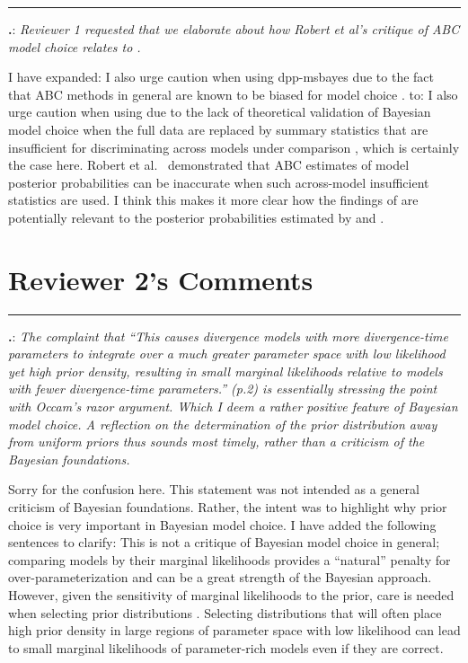 \documentclass[12pt]{article}
\newcounter{commentCounter}
\newcommand{\revcomment}[1]{{\addtocounter{commentCounter}{1}}
    \medskip \hrule \noindent
\textbf{\arabic{section}.\arabic{commentCounter}}: {\sl #1}\par\xspace}
\newcommand{\response}[1]{{\addtolength{\leftskip}{0.25in} #1\par}\xspace}
\let\quoteOld\quote
\let\endquoteOld\endquote
\renewenvironment{quote}{\sffamily\small\quoteOld}{\endquoteOld}
\begin{document}
\revcomment{
    Reviewer 1 requested that we elaborate about how Robert et al's
    \cite{Robert2011} critique of ABC model choice relates to \dppmsbayes.
}
\response{
    I have expanded:
    \begin{quote}
        I also urge caution when using dpp-msbayes due to the fact that ABC
        methods in general are known to be biased for model choice
        \cite{Robert2011}.
    \end{quote}
    to:
    \begin{quote}
        I also urge caution when using \dppmsbayes due to the lack of
        theoretical validation of Bayesian model choice when the full data are
        replaced by summary statistics that are insufficient for discriminating
        across models under comparison \cite{Robert2011}, which is certainly
        the case here.  Robert et al.\ \cite{Robert2011} demonstrated that ABC
        estimates of model posterior probabilities can be inaccurate when such
        across-model insufficient statistics are used.
    \end{quote}
    I think this makes it more clear how the findings of \cite{Robert2011} are
    potentially relevant to the posterior probabilities estimated by
    \dppmsbayes and \msb.
}

\section{Reviewer 2's Comments}
\setcounter{commentCounter}{0}

\revcomment{
    The complaint that ``This causes divergence models with more divergence-time
    parameters to integrate over a much greater parameter space with low
    likelihood yet high prior density, resulting in small marginal likelihoods
    relative to models with fewer divergence-time parameters.'' (p.2) is
    essentially stressing the point with Occam's razor argument. Which I deem a
    rather positive feature of Bayesian model choice. A reflection on the
    determination of the prior distribution away from uniform priors thus
    sounds most timely, rather than a criticism of the Bayesian foundations.
}
\response{
    Sorry for the confusion here. This statement was not intended as
    a general criticism of Bayesian foundations. Rather, the intent was to
    highlight why prior choice is very important in Bayesian model choice.
    I have added the following sentences to clarify:
    \begin{quote}
        This is not a critique of Bayesian model choice in general; comparing
        models by their marginal likelihoods provides a ``natural'' penalty for
        over-parameterization and can be a great strength of the Bayesian
        approach.  However, given the sensitivity of marginal likelihoods to
        the prior, care is needed when selecting prior distributions
        \cite{Lindley1957}.  Selecting distributions that will often place high
        prior density in large regions of parameter space with low likelihood
        can lead to small marginal likelihoods of parameter-rich models even if
        they are correct.
    \end{quote}
}
\end{document}

